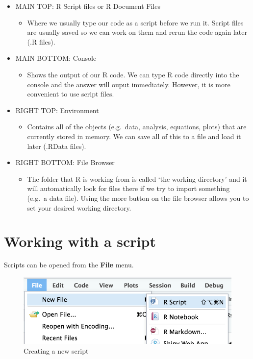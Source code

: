 \documentclass[
]{book}
\providecommand{\tightlist}{%
  \setlength{\itemsep}{0pt}\setlength{\parskip}{0pt}}
\begin{document}
\begin{itemize}
\tightlist
\item
  MAIN TOP: R Script files or R Document Files

  \begin{itemize}
  \tightlist
  \item
    Where we usually type our code as a script before we run it. Script files are usually saved so we can work on them and rerun the code again later (.R files).
  \end{itemize}
\item
  MAIN BOTTOM: Console

  \begin{itemize}
  \tightlist
  \item
    Shows the output of our R code. We can type R code directly into the console and the answer will ouput immediately. However, it is more convenient to use script files.
  \end{itemize}
\item
  RIGHT TOP: Environment

  \begin{itemize}
  \tightlist
  \item
    Contains all of the objects (e.g.~data, analysis, equations, plots) that are currently stored in memory. We can save all of this to a file and load it later (.RData files).
  \end{itemize}
\item
  RIGHT BOTTOM: File Browser

  \begin{itemize}
  \tightlist
  \item
    The folder that R is working from is called `the working directory' and it will automatically look for files there if we try to import something (e.g.~a data file). Using the more button on the file browser allows you to set your desired working directory.
  \end{itemize}
\end{itemize}

\hypertarget{working-with-a-script}{%
\section{Working with a script}\label{working-with-a-script}}

Scripts can be opened from the \textbf{File} menu.

\begin{figure}
\centering
\includegraphics{images/file.png}
\caption{Creating a new script}
\end{figure}
\end{document}

